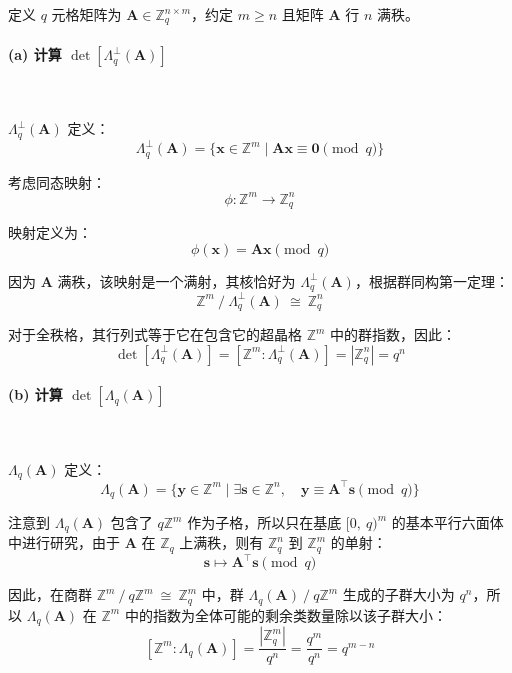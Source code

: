 \documentclass{article}
\begin{document}
定义 $q$ 元格矩阵为 $\bm{A}\in\mathbb{Z}_q^{n\times m}$，约定 $m\geqslant n$ 且矩阵 $\bm{A}$ 行 $n$ 满秩。



\paragraph*{(a) 计算 $\det\left[\Lambda_{q}^{\perp}\left(\bm{A}\right)\right]$}~{\\[-7pt]}

$\Lambda_{q}^{\perp}\left(\bm{A}\right)$ 定义：
\[ \Lambda_{q}^{\perp}\left(\bm{A}\right)=\{\bm{x}\in\mathbb{Z}^m\mid \bm{A}\bm{x}\equiv\bm{0}\pmod q\} \]

考虑同态映射：
\[ \phi:\mathbb{Z}^m\to\mathbb{Z}_q^n \]

映射定义为：
\[ \phi(\bm{x})=\bm{A}\bm{x}\pmod q \]

因为 $\bm{A}$ 满秩，该映射是一个满射，其核恰好为 $\Lambda_{q}^{\perp}\left(\bm{A}\right)$，根据群同构第一定理：
\[ \mathbb{Z}^{m}\ /\ \Lambda_{q}^{\perp}\left(\bm{A}\right)\ \cong\ \mathbb{Z}_q^n \]

对于全秩格，其行列式等于它在包含它的超晶格 $\mathbb{Z}^m$ 中的群指数，因此：
\[ \det\left[\Lambda_{q}^{\perp}\left(\bm{A}\right)\right]=\left[\mathbb{Z}^m:\Lambda_{q}^{\perp}\left(\bm{A}\right)\right]=\left\lvert\mathbb{Z}_q^n\right\rvert=q^n \]



\paragraph*{(b) 计算 $\det\left[\Lambda_{q}\left(\bm{A}\right)\right]$}~{\\[-7pt]}

$\Lambda_q(\bm{A})$ 定义：
\[ \Lambda_q(\bm{A})=\{\bm{y}\in\mathbb{Z}^m\mid\exists\bm{s}\in\mathbb{Z}^n,\quad\bm{y}\equiv\bm{A}^{\top}\bm{s}\pmod q\} \]

注意到 $\Lambda_q(\bm{A})$ 包含了 $q\mathbb{Z}^m$ 作为子格，所以只在基底 $[0,\ q)^m$ 的基本平行六面体中进行研究，由于 $\bm{A}$ 在 $\mathbb{Z}_q$ 上满秩，则有 $\mathbb{Z}_q^n$ 到 $\mathbb{Z}_q^m$ 的单射：
\[ \bm{s}\mapsto\bm{A}^{\top}\bm{s}\pmod q \]

因此，在商群 $\mathbb{Z}^m\ /\ q\mathbb{Z}^m\ \cong\ \mathbb{Z}_q^m$ 中，群 $\Lambda_q(\bm{A})\ /\ q\mathbb{Z}^m$ 生成的子群大小为 $q^n$，所以 $\Lambda_q(\bm{A})$ 在 $\mathbb{Z}^m$ 中的指数为全体可能的剩余类数量除以该子群大小：
\[ \left[\mathbb{Z}^m:\Lambda_q(\bm{A})\right]=\dfrac{\left\lvert\mathbb{Z}_q^m\right\rvert}{q^n}=\dfrac{q^m}{q^n}=q^{m-n} \]
\end{document}
